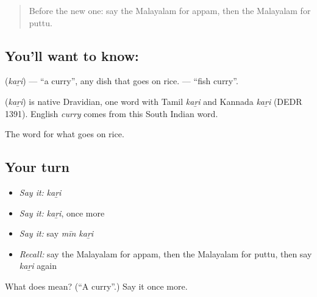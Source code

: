 \begin{quote}
Before the new one: say the Malayalam for appam, then the Malayalam for puttu.
\end{quote}

\subsection*{You'll want to know: }
\textbf{} (\emph{kaṟi}) — \textquotedblleft{}a curry\textquotedblright{}, any dish that goes on rice. \textbf{ } — \textquotedblleft{}fish curry\textquotedblright{}.

\begin{cousinweb}
\textbf{} (\emph{kaṟi}) is native Dravidian, one word with Tamil \emph{kaṟi} and Kannada \emph{kaṟi} (DEDR 1391). English \emph{curry} comes from this South Indian word.
\end{cousinweb}

\begin{grammarlens}[title={What you've built}]
The word for what goes on rice.
\end{grammarlens}

\subsection*{Your turn}
\begin{itemize}
\raggedright
  \item \emph{Say it:} \emph{kaṟi}
  \item \emph{Say it:} \emph{kaṟi}, once more
  \item \emph{Say it:} say \emph{mīn kaṟi}
  \item \emph{Recall:} say the Malayalam for appam, then the Malayalam for puttu, then say \emph{kaṟi} again
\end{itemize}

\begin{tcolorbox}[breakable,colback=teal!4,colframe=teal!35!black,title={Before you move on}]
What does  mean? (\textquotedblleft{}A curry\textquotedblright{}.) Say it once more.
\end{tcolorbox}
